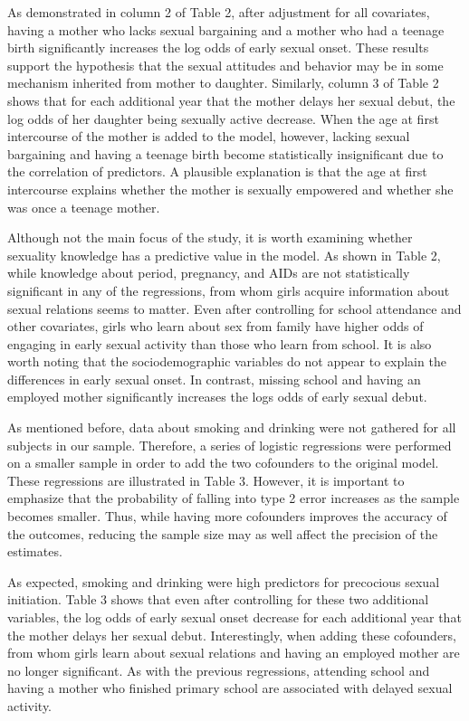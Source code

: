 \documentclass[
]{article}
\begin{document}
As demonstrated in column 2 of Table 2, after adjustment for all
covariates, having a mother who lacks sexual bargaining and a mother who
had a teenage birth significantly increases the log odds of early sexual
onset. These results support the hypothesis that the sexual attitudes
and behavior may be in some mechanism inherited from mother to daughter.
Similarly, column 3 of Table 2 shows that for each additional year that
the mother delays her sexual debut, the log odds of her daughter being
sexually active decrease. When the age at first intercourse of the
mother is added to the model, however, lacking sexual bargaining and
having a teenage birth become statistically insignificant due to the
correlation of predictors. A plausible explanation is that the age at
first intercourse explains whether the mother is sexually empowered and
whether she was once a teenage mother.

Although not the main focus of the study, it is worth examining whether
sexuality knowledge has a predictive value in the model. As shown in
Table 2, while knowledge about period, pregnancy, and AIDs are not
statistically significant in any of the regressions, from whom girls
acquire information about sexual relations seems to matter. Even after
controlling for school attendance and other covariates, girls who learn
about sex from family have higher odds of engaging in early sexual
activity than those who learn from school. It is also worth noting that
the sociodemographic variables do not appear to explain the differences
in early sexual onset. In contrast, missing school and having an
employed mother significantly increases the logs odds of early sexual
debut.

As mentioned before, data about smoking and drinking were not gathered
for all subjects in our sample. Therefore, a series of logistic
regressions were performed on a smaller sample in order to add the two
cofounders to the original model. These regressions are illustrated in
Table 3. However, it is important to emphasize that the probability of
falling into type 2 error increases as the sample becomes smaller. Thus,
while having more cofounders improves the accuracy of the outcomes,
reducing the sample size may as well affect the precision of the
estimates.

As expected, smoking and drinking were high predictors for precocious
sexual initiation. Table 3 shows that even after controlling for these
two additional variables, the log odds of early sexual onset decrease
for each additional year that the mother delays her sexual debut.
Interestingly, when adding these cofounders, from whom girls learn about
sexual relations and having an employed mother are no longer
significant. As with the previous regressions, attending school and
having a mother who finished primary school are associated with delayed
sexual activity.
\end{document}
